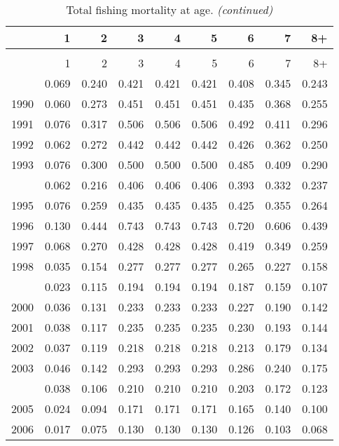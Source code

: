 \documentclass[
]{article}
\begin{document}
\begin{longtable}[t]{lrrrrrrrr}
\caption{\label{tab:FAA-tot-table}Total fishing mortality at age.}\\
\toprule
  & 1 & 2 & 3 & 4 & 5 & 6 & 7 & 8+\\
\midrule
\endfirsthead
\caption[]{Total fishing mortality at age. \textit{(continued)}}\\
\toprule
  & 1 & 2 & 3 & 4 & 5 & 6 & 7 & 8+\\
\midrule
\endhead

\endfoot
\bottomrule
\endlastfoot
1989 & 0.069 & 0.240 & 0.421 & 0.421 & 0.421 & 0.408 & 0.345 & 0.243\\
1990 & 0.060 & 0.273 & 0.451 & 0.451 & 0.451 & 0.435 & 0.368 & 0.255\\
1991 & 0.076 & 0.317 & 0.506 & 0.506 & 0.506 & 0.492 & 0.411 & 0.296\\
1992 & 0.062 & 0.272 & 0.442 & 0.442 & 0.442 & 0.426 & 0.362 & 0.250\\
1993 & 0.076 & 0.300 & 0.500 & 0.500 & 0.500 & 0.485 & 0.409 & 0.290\\
\addlinespace
1994 & 0.062 & 0.216 & 0.406 & 0.406 & 0.406 & 0.393 & 0.332 & 0.237\\
1995 & 0.076 & 0.259 & 0.435 & 0.435 & 0.435 & 0.425 & 0.355 & 0.264\\
1996 & 0.130 & 0.444 & 0.743 & 0.743 & 0.743 & 0.720 & 0.606 & 0.439\\
1997 & 0.068 & 0.270 & 0.428 & 0.428 & 0.428 & 0.419 & 0.349 & 0.259\\
1998 & 0.035 & 0.154 & 0.277 & 0.277 & 0.277 & 0.265 & 0.227 & 0.158\\
\addlinespace
1999 & 0.023 & 0.115 & 0.194 & 0.194 & 0.194 & 0.187 & 0.159 & 0.107\\
2000 & 0.036 & 0.131 & 0.233 & 0.233 & 0.233 & 0.227 & 0.190 & 0.142\\
2001 & 0.038 & 0.117 & 0.235 & 0.235 & 0.235 & 0.230 & 0.193 & 0.144\\
2002 & 0.037 & 0.119 & 0.218 & 0.218 & 0.218 & 0.213 & 0.179 & 0.134\\
2003 & 0.046 & 0.142 & 0.293 & 0.293 & 0.293 & 0.286 & 0.240 & 0.175\\
\addlinespace
2004 & 0.038 & 0.106 & 0.210 & 0.210 & 0.210 & 0.203 & 0.172 & 0.123\\
2005 & 0.024 & 0.094 & 0.171 & 0.171 & 0.171 & 0.165 & 0.140 & 0.100\\
2006 & 0.017 & 0.075 & 0.130 & 0.130 & 0.130 & 0.126 & 0.103 & 0.068\\

\end{longtable}
\end{document}
